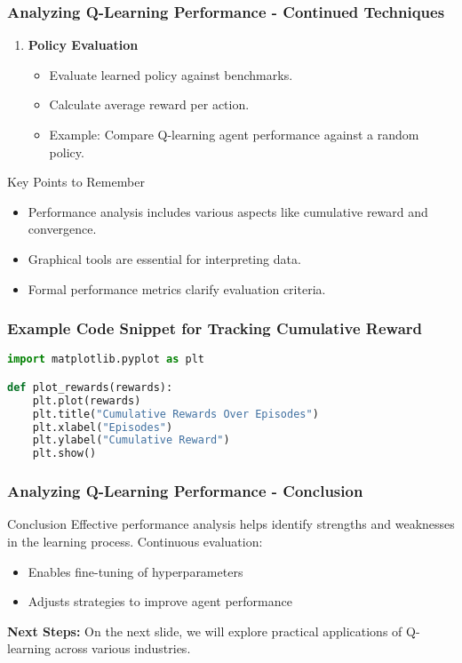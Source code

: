 \documentclass{beamer}
\begin{document}
\begin{frame}[fragile]
    \frametitle{Analyzing Q-Learning Performance - Continued Techniques}
    \begin{enumerate}[resume]
        \item \textbf{Policy Evaluation}
            \begin{itemize}
                \item Evaluate learned policy against benchmarks.
                \item Calculate average reward per action.
                \item Example: Compare Q-learning agent performance against a random policy.
            \end{itemize}
    \end{enumerate}

    \begin{block}{Key Points to Remember}
        \begin{itemize}
            \item Performance analysis includes various aspects like cumulative reward and convergence.
            \item Graphical tools are essential for interpreting data.
            \item Formal performance metrics clarify evaluation criteria.
        \end{itemize}
    \end{block}
\end{frame}

\begin{frame}[fragile]
    \frametitle{Example Code Snippet for Tracking Cumulative Reward}
    \begin{lstlisting}[language=Python]
import matplotlib.pyplot as plt

def plot_rewards(rewards):
    plt.plot(rewards)
    plt.title("Cumulative Rewards Over Episodes")
    plt.xlabel("Episodes")
    plt.ylabel("Cumulative Reward")
    plt.show()
    \end{lstlisting}
\end{frame}

\begin{frame}[fragile]
    \frametitle{Analyzing Q-Learning Performance - Conclusion}
    \begin{block}{Conclusion}
        Effective performance analysis helps identify strengths and weaknesses in the learning process. 
        Continuous evaluation:
        \begin{itemize}
            \item Enables fine-tuning of hyperparameters
            \item Adjusts strategies to improve agent performance
        \end{itemize}
    \end{block}
    
    \textbf{Next Steps:} On the next slide, we will explore practical applications of Q-learning across various industries.
\end{frame}
\end{document}
